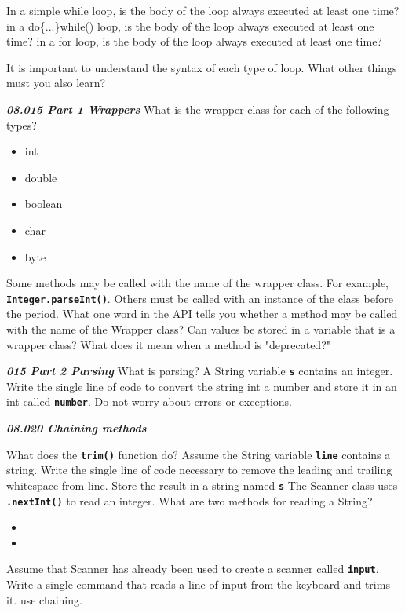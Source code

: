 \documentclass[letterpaper,11pt]{exam}
\newcommand{\videoheading}[1]{\Large\textbf{\textit{#1}}}
\begin{document}
\begin{questions}
  \question In a simple while loop, is the body of the loop always executed at least one time?
  \question in a do\{...\}while() loop, is the body of the loop always executed at least one time?
  \question in a for loop, is the body of the loop always executed at least one time?

  \question It is important to understand the syntax of each type of loop.  What other things must you also learn?
  \vspace*{1cm}

  \videoheading{08.015 Part 1 Wrappers}
\question What is the wrapper class for each of the following types?
\begin{itemize}
  \item int
  \item double 
  \item boolean
  \item char
  \item byte
\end{itemize}
\question Some methods may be called with the name of the wrapper class.  For example, \texttt{\textbf{Integer.parseInt()}}. Others must be called with an instance of the class before the period.  What one word in the API tells you whether a method may be called with the name of the Wrapper class?
\question Can values be stored in a variable that is a wrapper class?
\question What does it mean when a method is "deprecated?"
\vspace{1cm}

\videoheading{015 Part 2 Parsing}
\question What is parsing?
\vspace{1cm}
\question A String variable \texttt{\textbf{s}} contains an integer.  Write the single line of code to convert the string int a number and store it in an int called \texttt{\textbf{number}}.  Do not worry about errors or exceptions.
\vspace{1cm}

\videoheading{08.020 Chaining methods}

\question What does the \texttt{\textbf{trim()}} function do?
\question Assume the String variable \texttt{\textbf{line}} contains a string.  Write the single line of code necessary to remove the leading and trailing whitespace from line.  Store the result in a string named \texttt{\textbf{s}}
\vspace{1cm}
\question The Scanner class uses \texttt{\textbf{.nextInt()}} to read an integer.  What are two methods for reading a String?
\begin{itemize}
  \item
  \item
\end{itemize}
\question Assume that Scanner has already been used to create a scanner called \texttt{\textbf{input}}.  Write a single command that reads a line of input from the keyboard and trims it.  use chaining.
\vspace*{1cm}


\end{questions}
\end{document}
